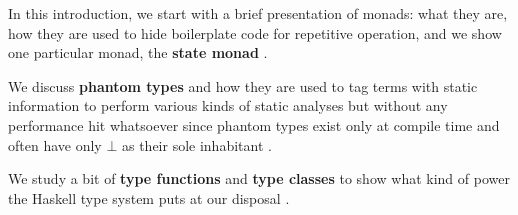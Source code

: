 In this introduction, we start with a brief presentation of 
monads: what they are, how they are used to hide boilerplate
code for repetitive operation, and we show one particular 
monad, the \textbf{state monad} \cite{1}.

We discuss \textbf{phantom types} and how they are used to 
tag terms with static information to perform various kinds 
of static analyses but without any performance hit whatsoever
since phantom types exist only at compile time and often have 
only $\bot$ as their sole inhabitant \cite{11,12,13}.

We study a bit of \textbf{type functions} and 
\textbf{type classes} to show what kind of power the Haskell
type system puts at our disposal \cite{10,8,6}.